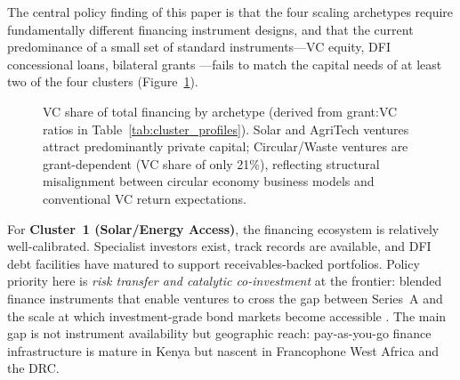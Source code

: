 \documentclass[review,12pt]{elsarticle}
\begin{document}
The central policy finding of this paper is that the four scaling
archetypes require fundamentally different financing instrument
designs, and that the current predominance of a small set of standard
instruments---VC equity, DFI concessional loans, bilateral grants
---fails to match the capital needs of at least two of the four
clusters (Figure~\ref{fig:finance}).

\begin{figure}[htbp]
\centering
{}
\caption{VC share of total financing by archetype (derived from grant:VC ratios in Table~\ref{tab:cluster_profiles}). Solar and AgriTech ventures attract predominantly private capital; Circular/Waste ventures are grant-dependent (VC share of only 21\%), reflecting structural misalignment between circular economy business models and conventional VC return expectations.}
\label{fig:finance}
\end{figure}

For \textbf{Cluster~1 (Solar/Energy Access)}, the financing ecosystem
is relatively well-calibrated. Specialist investors exist, track
records are available, and DFI debt facilities have matured to support
receivables-backed portfolios. Policy priority here is
\textit{risk transfer and catalytic co-investment} at the frontier:
blended finance instruments that enable ventures to cross the gap
between Series~A and the scale at which investment-grade bond markets
become accessible \citep{lall2021scaling}. The main gap is not
instrument availability but geographic reach: pay-as-you-go finance
infrastructure is mature in Kenya but nascent in Francophone West
Africa and the DRC.
\end{document}
